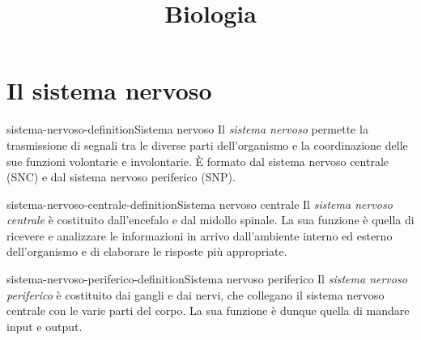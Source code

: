 \documentclass[preview]{standalone}
\begin{document}
\title{Biologia}
\genpage

\section{Il sistema nervoso}

\begin{snippetdefinition}{sistema-nervoso-definition}{Sistema nervoso}
    Il \textit{sistema nervoso} permette la trasmissione di segnali tra le diverse parti dell'organismo e
    la coordinazione delle sue funzioni volontarie e involontarie. È formato dal sistema nervoso
    centrale (SNC) e dal sistema nervoso periferico (SNP).
\end{snippetdefinition}

\begin{snippetdefinition}{sistema-nervoso-centrale-definition}{Sistema nervoso centrale}
    Il \textit{sistema nervoso centrale} è costituito dall'encefalo e dal midollo spinale.
    La sua funzione è quella di ricevere e analizzare le informazioni in
    arrivo dall'ambiente interno ed esterno dell'organismo e di elaborare le risposte più appropriate.
\end{snippetdefinition}

\begin{snippetdefinition}{sistema-nervoso-periferico-definition}{Sistema nervoso periferico}
    Il \textit{sistema nervoso periferico} è costituito dai 
    gangli e dai nervi, che collegano il sistema nervoso centrale
    con le varie parti del corpo.
    La sua funzione è dunque quella di mandare input e output.
\end{snippetdefinition}
\end{document}
